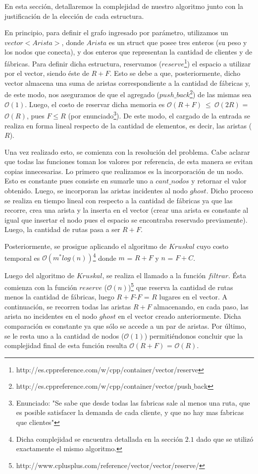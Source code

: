  En esta sección, detallaremos la complejidad de nuestro algoritmo junto con la justificación de la elección de cada estructura. 

En principio, para definir el grafo ingresado por parámetro, utilizamos un $vector<Arista>$, donde $Arista$ es un struct que posee tres enteros (su peso y los nodos que conecta), y dos enteros que representan la cantidad de clientes y de fábricas. Para definir dicha estructura, reservamos ($reserve$\footnote{http://es.cppreference.com/w/cpp/container/vector/reserve}) el espacio a utilizar por el vector, siendo éste de $R + F$. Esto se debe a que, posteriormente, dicho vector almacena una suma de aristas correspondiente a la cantidad de fábricas y, de este modo, nos aseguramos de que el agregado ($push\_back$\footnote{http://es.cppreference.com/w/cpp/container/vector/push$\_$back}) de las mismas sea $\mathcal{O}(1)$. Luego, el costo de reservar dicha memoria es $\mathcal{O}(R + F)\ \leq\ \mathcal{O}(2R)$ = $\mathcal{O}(R)$, pues $F \leq R$ (por enunciado\footnote{Enunciado: "Se sabe que desde todas las fabricas sale al menos una ruta, que es posible satisfacer la demanda de cada cliente, y que no hay mas fabricas que clientes"}). De este modo, el cargado de la entrada se realiza en forma lineal respecto de la cantidad de elementos, es decir, las aristas ($R$).

 Una vez realizado esto, se comienza con la resolución del problema. Cabe aclarar que todas las funciones toman los valores por referencia, de esta manera se evitan copias innecesarias. Lo primero que realizamos es la incorporación de un nodo. Esto es constante pues consiste en sumarle uno a $cant\_nodos$ y retornar el valor obtenido. Luego, se incorporan las aristas incidentes al nodo $ghost$. Dicho proceso se realiza en tiempo lineal con respecto a la cantidad de fábricas ya que las recorre, crea una arista y la inserta en el vector (crear una arista es constante al igual que insertar el nodo pues el espacio se encontraba reservado previamente). Luego, la cantidad de rutas pasa a ser $R+F$.

 Posteriormente, se prosigue aplicando el algoritmo de $Kruskal$ cuyo costo temporal es $\mathcal{O}(m^*log(n))$\footnote{Dicha complejidad se encuentra detallada en la sección $2.1$ dado que se utilizó exactamente el mismo algoritmo.} donde $m$ = $R+F$ y $n$ = $F+C$.

 Luego del algoritmo de $Kruskal$, se realiza el llamado a la función $filtrar$. Ésta comienza con la función $reserve$ ($\mathcal{O}(n)$)\footnote{http://www.cplusplus.com/reference/vector/vector/reserve/} que reserva la cantidad de rutas menos la cantidad de fábricas, luego $R+F$-$F$ = $R$ lugares en el vector. A continuación, se recorren todas las aristas $R+F$ almacenando, en cada paso, las arista no incidentes en el nodo $ghost$ en el vector creado anteriormente. Dicha comparación es constante ya que sólo se accede a un par de aristas. Por último, se le resta uno a la cantidad de nodos ($\mathcal{O}(1)$) permitiéndonos concluir que la complejidad final de esta función resulta $\mathcal{O}(R+F)$ = $\mathcal{O}(R)$.

